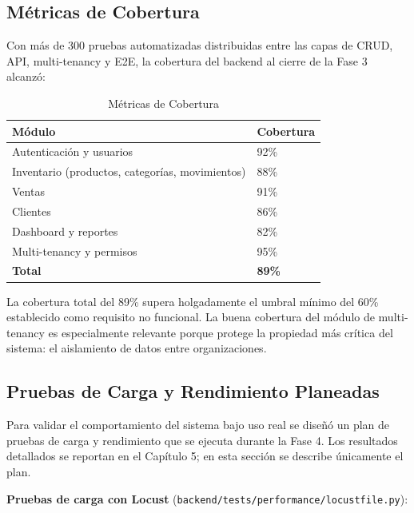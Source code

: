 \subsection{Métricas de Cobertura}\label{muxe9tricas-de-cobertura}

Con más de 300 pruebas automatizadas distribuidas entre las capas de CRUD, API, multi-tenancy y E2E, la cobertura del backend al cierre de la Fase 3 alcanzó:

\begin{longtable}[]{@{}ll@{}}
\caption[Métricas de Cobertura]{Métricas de Cobertura}\tabularnewline
\toprule\noalign{}
Módulo & Cobertura \\
\midrule\noalign{}
\endhead
\bottomrule\noalign{}
\endlastfoot
Autenticación y usuarios & 92\% \\
Inventario (productos, categorías, movimientos) & 88\% \\
Ventas & 91\% \\
Clientes & 86\% \\
Dashboard y reportes & 82\% \\
Multi-tenancy y permisos & 95\% \\
\textbf{Total} & \textbf{89\%} \\
\end{longtable}

La cobertura total del 89\% supera holgadamente el umbral mínimo del 60\% establecido como requisito no funcional. La buena cobertura del módulo de multi-tenancy es especialmente relevante porque protege la propiedad más crítica del sistema: el aislamiento de datos entre organizaciones.

\subsection{Pruebas de Carga y Rendimiento Planeadas}\label{pruebas-de-carga-y-rendimiento-planeadas}

Para validar el comportamiento del sistema bajo uso real se diseñó un plan de pruebas de carga y rendimiento que se ejecuta durante la Fase 4. Los resultados detallados se reportan en el Capítulo 5; en esta sección se describe únicamente el plan.

\textbf{Pruebas de carga con Locust} (\texttt{backend/tests/performance/locustfile.py}):

